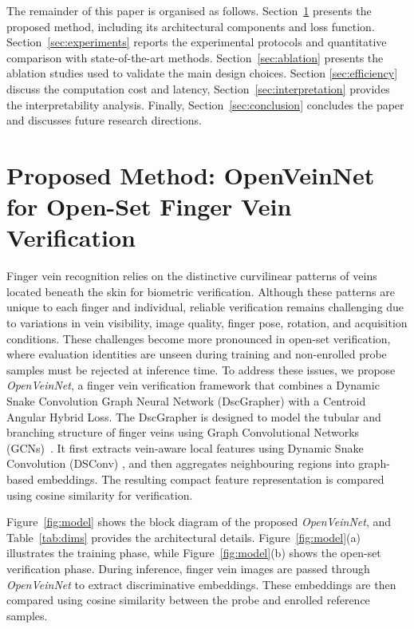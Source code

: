 \documentclass[10pt,journal,compsoc]{IEEEtran}
\begin{document}
The remainder of this paper is organised as follows. Section~\ref{sec:proposed} presents the proposed method, including its architectural components and loss function. Section~\ref{sec:experiments} reports the experimental protocols and quantitative comparison with state-of-the-art methods. Section~\ref{sec:ablation} presents the ablation studies used to validate the main design choices. Section \ref{sec:efficiency} discuss the computation cost and latency, Section~\ref{sec:interpretation} provides the interpretability analysis. Finally, Section~\ref{sec:conclusion} concludes the paper and discusses future research directions.
\section{Proposed Method: OpenVeinNet for Open-Set Finger Vein Verification}
\label{sec:proposed}

Finger vein recognition relies on the distinctive curvilinear patterns of veins located beneath the skin for biometric verification. Although these patterns are unique to each finger and individual, reliable verification remains challenging due to variations in vein visibility, image quality, finger pose, rotation, and acquisition conditions. These challenges become more pronounced in open-set verification, where evaluation identities are unseen during training and non-enrolled probe samples must be rejected at inference time. To address these issues, we propose \textit{OpenVeinNet}, a finger vein verification framework that combines a Dynamic Snake Convolution Graph Neural Network (DscGrapher) with a Centroid Angular Hybrid Loss. The DscGrapher is designed to model the tubular and branching structure of finger veins using Graph Convolutional Networks (GCNs)~\cite{deepgcns}. It first extracts vein-aware local features using Dynamic Snake Convolution (DSConv) \cite{dsc}, and then aggregates neighbouring regions into graph-based embeddings. The resulting compact feature representation is compared using cosine similarity for verification.

Figure~\ref{fig:model} shows the block diagram of the proposed \textit{OpenVeinNet}, and Table~\ref{tab:dims} provides the architectural details. Figure~\ref{fig:model}(a) illustrates the training phase, while Figure~\ref{fig:model}(b) shows the open-set verification phase. During inference, finger vein images are passed through \textit{OpenVeinNet} to extract discriminative embeddings. These embeddings are then compared using cosine similarity between the probe and enrolled reference samples.
\end{document}
